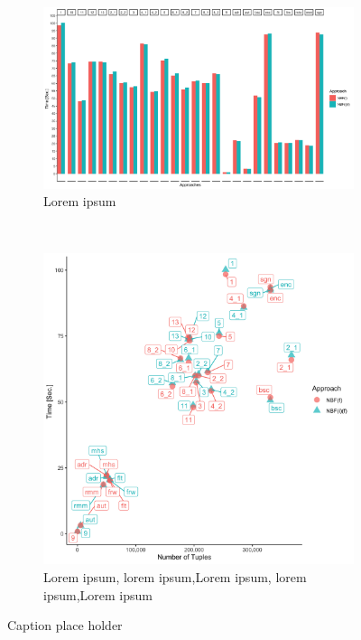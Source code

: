 \begin{figure}[t!]
    \centering
    \begin{subfigure}[t]{0.5\textwidth}
        \centering
        \includegraphics[width=\textwidth]{figs/plots/enron-nbf-f.png}
        \caption{Lorem ipsum}
    \end{subfigure}%
    ~ 
    \begin{subfigure}[t]{0.5\textwidth}
        \centering
        \includegraphics[scale=0.09]{figs/plots/enron-nbf-f-scatter.png}
        \caption{Lorem ipsum, lorem ipsum,Lorem ipsum, lorem ipsum,Lorem ipsum}
    \end{subfigure}
    \caption{Caption place holder}
\end{figure}

